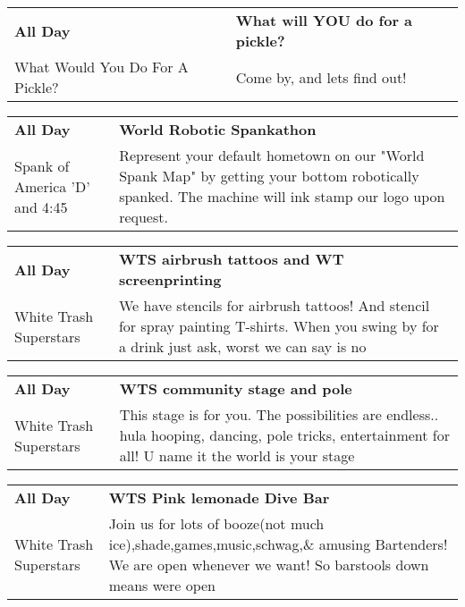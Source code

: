 \begin{tabular}{ p{1in} p{2.2in} }
    \textbf{All Day} & \textbf{What will YOU do for a pickle?} \\
    What Would You Do For A Pickle? \newline  & Come by, and lets find out! \\
    \hline 
\end{tabular}
    
\begin{tabular}{ p{1in} p{2.2in} }
    \textbf{All Day} & \textbf{World Robotic Spankathon} \\
    Spank of America \newline 'D' and 4:45 & Represent your default hometown on our "World Spank Map" by getting your bottom robotically spanked. The machine will ink stamp our logo upon request. \\
    \hline 
\end{tabular}
    
\begin{tabular}{ p{1in} p{2.2in} }
    \textbf{All Day} & \textbf{WTS airbrush tattoos and WT screenprinting} \\
    White Trash Superstars \newline  & We have stencils for airbrush tattoos! And stencil for spray painting T-shirts. When you swing by for a drink just ask, worst we can say is no \\
    \hline 
\end{tabular}
    
\begin{tabular}{ p{1in} p{2.2in} }
    \textbf{All Day} & \textbf{WTS community stage and pole} \\
    White Trash Superstars \newline  & This stage is for you. The possibilities are endless.. hula hooping,  dancing, pole tricks, entertainment for all! U name it the world is your stage \\
    \hline 
\end{tabular}
    
\begin{tabular}{ p{1in} p{2.2in} }
    \textbf{All Day} & \textbf{WTS Pink lemonade Dive Bar} \\
    White Trash Superstars \newline  & Join us for lots of booze(not much ice),shade,games,music,schwag,\& amusing Bartenders! We are open whenever we want! So barstools down means were open \\
    \hline 
\end{tabular}
    
